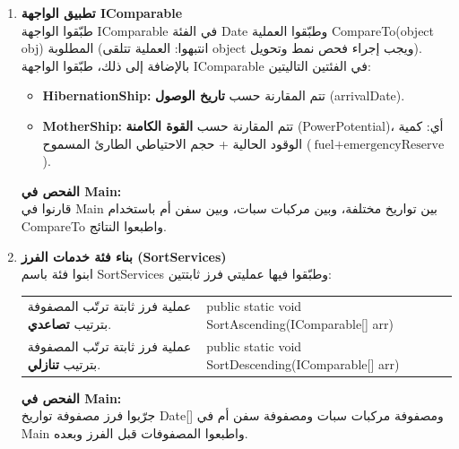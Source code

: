 \documentclass[14pt]{extarticle}
\begin{document}
\begin{enumerate}[label=\textbf{تمرين \arabic*:}, wide=0pt, leftmargin=*, itemsep=2.2em]
    \item \textbf{تطبيق الواجهة \textenglish{IComparable}} \\
    طبّقوا الواجهة \textenglish{IComparable} في الفئة \textenglish{Date} وطبّقوا العملية \textenglish{CompareTo(object obj)} المطلوبة (انتبهوا: العملية تتلقى \textenglish{object} ويجب إجراء فحص نمط وتحويل). \\
    بالإضافة إلى ذلك، طبّقوا الواجهة \textenglish{IComparable} في الفئتين التاليتين:
    \begin{itemize}
        \item \textbf{\textenglish{HibernationShip}:} تتم المقارنة حسب \textbf{تاريخ الوصول} (\textenglish{arrivalDate}).
        \item \textbf{\textenglish{MotherShip}:} تتم المقارنة حسب \textbf{القوة الكامنة} (\textenglish{PowerPotential})، أي: كمية الوقود الحالية + حجم الاحتياطي الطارئ المسموح ($\text{fuel} + \text{emergencyReserve}$).
    \end{itemize}
    \textbf{الفحص في \textenglish{Main}:} \\
    قارنوا في \textenglish{Main} بين تواريخ مختلفة، وبين مركبات سبات، وبين سفن أم باستخدام \textenglish{CompareTo} واطبعوا النتائج.

    \item \textbf{بناء فئة خدمات الفرز (\textenglish{SortServices})} \\
    ابنوا فئة باسم \textenglish{SortServices} وطبّقوا فيها عمليتي فرز ثابتتين:

    {\centering
    \renewcommand{\arraystretch}{1.2}
    \small
    \begin{tabular}{|>{\raggedleft\arraybackslash}p{}|>{\raggedright\arraybackslash}p{}|}
    \hline
    \multicolumn{2}{|c|}{\textbf{الفئة: \textenglish{SortServices}}} \\
    \hline
    عملية فرز ثابتة ترتّب المصفوفة بترتيب \textbf{تصاعدي}. & \textenglish{public static void SortAscending(IComparable[] arr)} \\
    \hline
    عملية فرز ثابتة ترتّب المصفوفة بترتيب \textbf{تنازلي}. & \textenglish{public static void SortDescending(IComparable[] arr)} \\
    \hline
    \end{tabular}
    \par} %

    \vspace{2em}
    \noindent \textbf{الفحص في \textenglish{Main}:} \\
    جرّبوا فرز مصفوفة تواريخ \textenglish{Date[]} ومصفوفة مركبات سبات ومصفوفة سفن أم في \textenglish{Main} واطبعوا المصفوفات قبل الفرز وبعده.


\end{enumerate}
\end{document}

